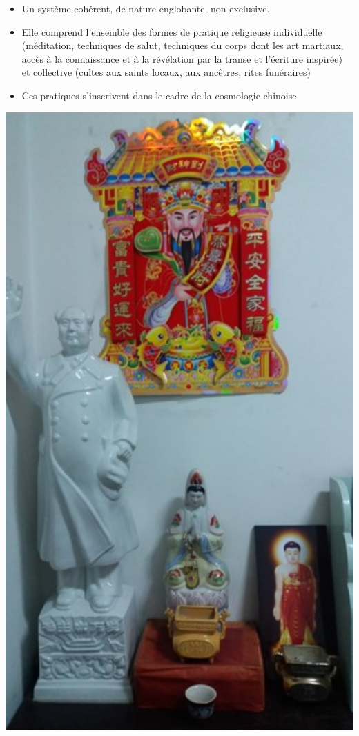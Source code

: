 \FloatBarrier
\begin{Def}
    \begin{itemize}
        \item 	Un système cohérent, de nature englobante, non exclusive.
\item 	Elle comprend l’ensemble des formes de pratique religieuse individuelle (méditation, techniques de salut, techniques du corps dont les art martiaux, accès à la connaissance et à la révélation par la transe et l’écriture inspirée) et collective (cultes aux saints locaux, aux ancêtres, rites funéraires)
\item 	Ces pratiques s’inscrivent dans le cadre de la cosmologie chinoise.

    \end{itemize}
\end{Def}
\begin{marginfigure}
      \includegraphics[width=1\textwidth]{ConfucianismeTaoismeBouddhismeChinois/Images/ReligionChine.jpg}
\end{marginfigure}

